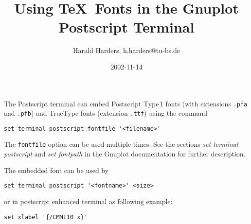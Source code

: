 \documentclass[a4paper,10pt]{article}
\begin{document}
\title{Using \TeX\ Fonts in the Gnuplot Postscript Terminal}
\author{Harald Harders, {\ttfamily h.harders@tu-bs.de}}
\date{2002-11-14}
\maketitle

The Postscript terminal can embed Postscript Type\,1 fonts (with
extensions \verb|.pfa| and \verb|.pfb|) and TrueType fonts (extension
\verb|.ttf|) using the command
\begin{verbatim}
set terminal postscript fontfile '<filename>'
\end{verbatim}
The \verb|fontfile| option can be used multiple times.
See the sections \emph{set terminal postscript} and \emph{set
  fontpath} in the Gnuplot documentation for further description.

The embedded font can be used by 
\begin{verbatim}
set terminal postscript '<fontname>' <size>
\end{verbatim}
or in postscript enhanced terminal as following example:
\begin{verbatim}
set xlabel '{/CMMI10 x}'
\end{verbatim}
\end{document}
